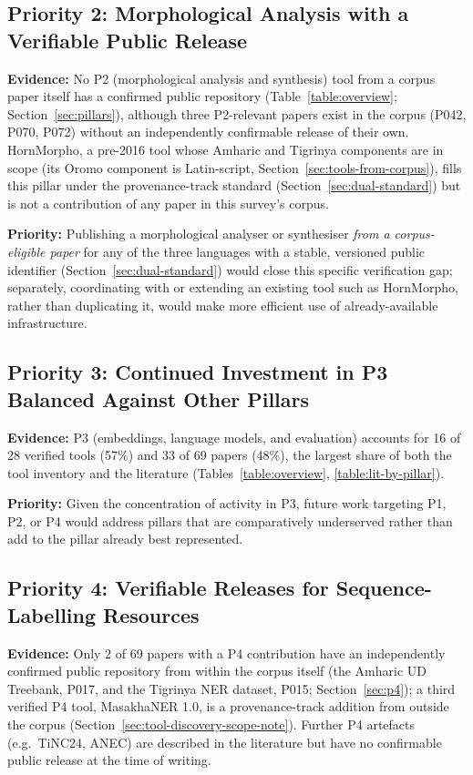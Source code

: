\documentclass[sn-mathphys-num]{sn-jnl}
\theoremstyle{thmstyleone}
\theoremstyle{thmstyletwo}
\theoremstyle{thmstylethree}
\begin{document}
\subsection{Priority 2: Morphological Analysis with a Verifiable Public Release}

\textbf{Evidence:} No P2 (morphological analysis and synthesis) tool from a corpus paper itself has a confirmed public repository (Table~\ref{table:overview}; Section~\ref{sec:pillars}), although three P2-relevant papers exist in the corpus (P042, P070, P072) without an independently confirmable release of their own. HornMorpho, a pre-2016 tool whose Amharic and Tigrinya components are in scope (its Oromo component is Latin-script, Section~\ref{sec:tools-from-corpus}), fills this pillar under the provenance-track standard (Section~\ref{sec:dual-standard}) but is not a contribution of any paper in this survey's corpus.

\textbf{Priority:} Publishing a morphological analyser or synthesiser \emph{from a corpus-eligible paper} for any of the three languages with a stable, versioned public identifier (Section~\ref{sec:dual-standard}) would close this specific verification gap; separately, coordinating with or extending an existing tool such as HornMorpho, rather than duplicating it, would make more efficient use of already-available infrastructure.

\subsection{Priority 3: Continued Investment in P3 Balanced Against Other Pillars}

\textbf{Evidence:} P3 (embeddings, language models, and evaluation) accounts for 16 of 28 verified tools (57\%) and 33 of 69 papers (48\%), the largest share of both the tool inventory and the literature (Tables~\ref{table:overview}, \ref{table:lit-by-pillar}).

\textbf{Priority:} Given the concentration of activity in P3, future work targeting P1, P2, or P4 would address pillars that are comparatively underserved rather than add to the pillar already best represented.

\subsection{Priority 4: Verifiable Releases for Sequence-Labelling Resources}

\textbf{Evidence:} Only 2 of 69 papers with a P4 contribution have an independently confirmed public repository from within the corpus itself (the Amharic UD Treebank, P017, and the Tigrinya NER dataset, P015; Section~\ref{sec:p4}); a third verified P4 tool, MasakhaNER 1.0, is a provenance-track addition from outside the corpus (Section~\ref{sec:tool-discovery-scope-note}). Further P4 artefacts (e.g.\ TiNC24, ANEC) are described in the literature but have no confirmable public release at the time of writing.
\end{document}
